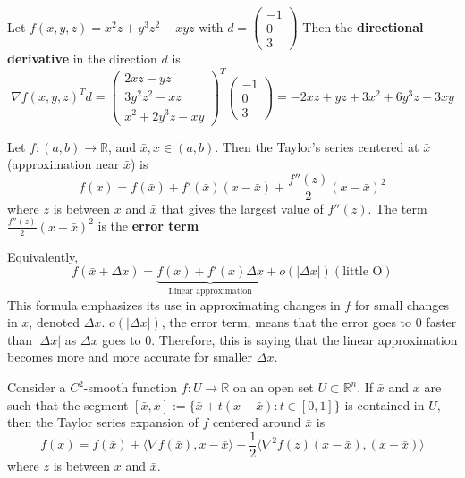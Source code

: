 \begin{problem}
  Let $f(x,y,z) = x^2z + y^3z^2 - xyz$ with $d = \begin{pmatrix}
      -1 \\ 0 \\ 3
  \end{pmatrix}$ Then the \textbf{directional derivative} in the direction $d$ is
  $$\nabla f(x,y,z)^T d = \begin{pmatrix}
      2xz - yz \\
      3y^2z^2 - xz \\
      x^2 + 2y^3z - xy
  \end{pmatrix}^{T} \begin{pmatrix}
      -1 \\ 0 \\ 3
  \end{pmatrix} = -2xz + yz + 3x^2 + 6y^3z - 3xy$$
\end{problem}
\begin{theorem}
  Let $f: (a, b) \rightarrow \mathbb R$, and $\bar{x}, x \in (a,b)$. Then the Taylor's series centered at $\bar x$ (approximation near $\bar x$) is $$f(x) = f(\bar x) + f'(\bar x)(x - \bar x) + \frac{f''(z)}{2}(x - \bar x)^2$$
  where $z$ is between $x$ and $\bar x$ that gives the largest value of $f''(z)$. The term $\frac{f''(z)}{2}(x - \bar x)^2$ is the \textbf{error term}

  Equivalently,
  $$f(\bar x + \Delta x) = \underbrace{f(x) + f'(x) \Delta x}_{\text{Linear approximation}} + o(|\Delta x|)(\text{little O})$$
  This formula emphasizes its use in approximating changes in $f$ for small changes in $x$, denoted $\Delta x$. $o(|\Delta x|)$, the error term, means that the error goes to 0 faster than $|\Delta x|$ as $\Delta x$ goes to 0. Therefore, this is saying that the linear approximation becomes more and more accurate for smaller $\Delta x$.
\end{theorem}
\begin{theorem}
  Consider a $C^2$-smooth function $f: U \rightarrow \mathbb R$ on an open set $U \subset \mathbb R^n$. If $\bar x$ and $x$ are such that the segment $[\bar x, x] := \{\bar x + t(x - \bar x): t \in [0,1]\}$ is contained in $U$, then the Taylor series expansion of $f$ centered around $\bar x$ is
  $$f(x) = f(\bar x) + \langle \nabla f(\bar x), x - \bar x \rangle + \frac{1}{2} \langle \nabla^2 f(z) (x - \bar x), (x - \bar x) \rangle$$
  where $z$ is between $x$ and $\bar x$.
\end{theorem}
